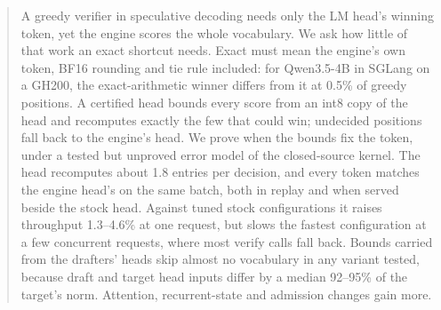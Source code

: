 \begin{abstract}
A greedy verifier in speculative decoding needs only the LM head's winning token, yet the engine scores the whole vocabulary. We ask how little of that work an exact shortcut needs. Exact must mean the engine's own token, BF16 rounding and tie rule included: for Qwen3.5-4B in SGLang on a GH200, the exact-arithmetic winner differs from it at 0.5\% of greedy positions. A certified head bounds every score from an int8 copy of the head and recomputes exactly the few that could win; undecided positions fall back to the engine's head. We prove when the bounds fix the token, under a tested but unproved error model of the closed-source kernel. The head recomputes about 1.8 entries per decision, and every token matches the engine head's on the same batch, both in replay and when served beside the stock head. Against tuned stock configurations it raises throughput 1.3--4.6\% at one request, but slows the fastest configuration at a few concurrent requests, where most verify calls fall back. Bounds carried from the drafters' heads skip almost no vocabulary in any variant tested, because draft and target head inputs differ by a median 92--95\% of the target's norm. Attention, recurrent-state and admission changes gain more.
\end{abstract}
